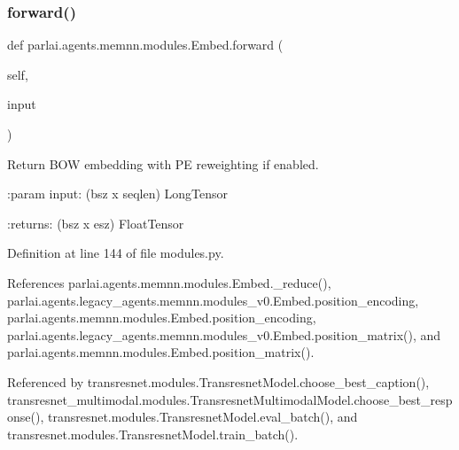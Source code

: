 \subsubsection{\texorpdfstring{forward()}{forward()}}
{\footnotesize\ttfamily def parlai.\+agents.\+memnn.\+modules.\+Embed.\+forward (\begin{DoxyParamCaption}\item[{}]{self,  }\item[{}]{input }\end{DoxyParamCaption})}

\begin{DoxyVerb}Return BOW embedding with PE reweighting if enabled.

:param input:
    (bsz x seqlen) LongTensor

:returns:
    (bsz x esz) FloatTensor
\end{DoxyVerb}
 

Definition at line 144 of file modules.\+py.



References parlai.\+agents.\+memnn.\+modules.\+Embed.\+\_\+reduce(), parlai.\+agents.\+legacy\+\_\+agents.\+memnn.\+modules\+\_\+v0.\+Embed.\+position\+\_\+encoding, parlai.\+agents.\+memnn.\+modules.\+Embed.\+position\+\_\+encoding, parlai.\+agents.\+legacy\+\_\+agents.\+memnn.\+modules\+\_\+v0.\+Embed.\+position\+\_\+matrix(), and parlai.\+agents.\+memnn.\+modules.\+Embed.\+position\+\_\+matrix().



Referenced by transresnet.\+modules.\+Transresnet\+Model.\+choose\+\_\+best\+\_\+caption(), transresnet\+\_\+multimodal.\+modules.\+Transresnet\+Multimodal\+Model.\+choose\+\_\+best\+\_\+response(), transresnet.\+modules.\+Transresnet\+Model.\+eval\+\_\+batch(), and transresnet.\+modules.\+Transresnet\+Model.\+train\+\_\+batch().

